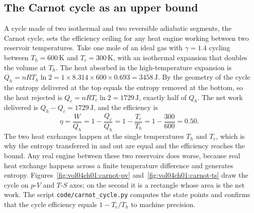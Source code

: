 \subsection{The Carnot cycle as an upper bound}

A cycle made of two isothermal and two reversible adiabatic segments,
the Carnot cycle, sets the efficiency ceiling for any heat engine
working between two reservoir temperatures. Take one mole of an ideal
gas with $\gamma = 1.4$ cycling between $T_h = 600\,\si{\kelvin}$ and
$T_c = 300\,\si{\kelvin}$, with an isothermal expansion that doubles
the volume at $T_h$. The heat absorbed in the high-temperature
expansion is $Q_h = nRT_h \ln 2 = 1 \times 8.314 \times 600 \times
0.693 = 3458\,\text{J}$. By the geometry of the cycle the entropy
delivered at the top equals the entropy removed at the bottom, so the
heat rejected is $Q_c = nRT_c \ln 2 = 1729\,\text{J}$, exactly half of
$Q_h$. The net work delivered is $Q_h - Q_c = 1729\,\text{J}$, and the
efficiency is
\[
\eta = \frac{W}{Q_h} = 1 - \frac{Q_c}{Q_h} = 1 - \frac{T_c}{T_h} =
1 - \frac{300}{600} = 0.50.
\]
The two heat exchanges happen at the single temperatures $T_h$ and
$T_c$, which is why the entropy transferred in and out are equal and
the efficiency reaches the bound. Any real engine between these two
reservoirs does worse, because real heat exchange happens across a
finite temperature difference and generates entropy.
Figures~\ref{fig:vol04ch01:carnot-pv} and~\ref{fig:vol04ch01:carnot-ts}
draw the cycle on $p$-$V$ and $T$-$S$ axes; on the second it is a
rectangle whose area is the net work. The script
\texttt{code/carnot\_cycle.py} computes the state points and confirms
that the cycle efficiency equals $1 - T_c/T_h$ to machine precision.





